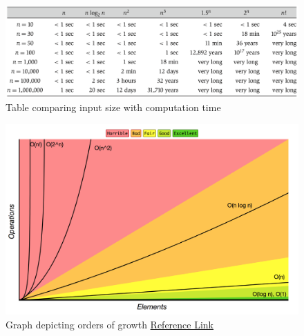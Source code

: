 \begin{figure}[H]
\centering
\includegraphics[scale=0.45]{figures/MDS4.png}
\caption{Table comparing input size with computation time}
    \label{fig:example_figure}
\end{figure}

\begin{figure}[H]
\centering
\includegraphics[scale=0.4]{figures/MDS1.png}
\caption{Graph depicting orders of growth \href{http://bigocheatsheet.com/}{Reference Link}}
    \label{fig:example_figure}
\end{figure}




